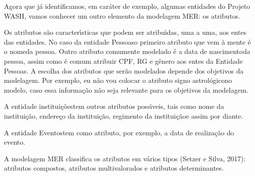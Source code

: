 \documentclass[
12pt,		%
openright,	%
twoside,  %
a4paper,			%
chapter=TITLE,		%
english,			%
french,				%
spanish,			%
brazil				%
]{USPSC-classe/USPSC}
\begin{document}
Agora que j\'a identificamos, em car\'ater de exemplo, algumas entidades do Projeto WASH, vamos conhecer um outro elemento da modelagem MER: os atributos.














Os atributos s\~ao caracter\'{\i}sticas que podem ser atribu\'{\i}das, uma a uma, aos entes das entidades. No caso da entidade \textquotedbl Pessoas\textquotedbl  o primeiro atributo que vem \`a mente \'e o \textquotedbl nome\textquotedbl  da pessoa. Outro atributo comumente modelado \'e a \textquotedbl data de nascimento\textquotedbl  da pessoa, assim como \'e comum atribuir CPF, RG e g\^enero aos entes da Entidade \textquotedbl Pessoas\textquotedbl . A escolha dos atributos que ser\~ao modelados depende dos objetivos da modelagem. Por exemplo, eu n\~ao vou colocar o atributo \textquotedbl signo astrol\'ogico\textquotedbl  no modelo, caso essa informa\c{c}\~ao n\~ao seja relevante para os objetivos da modelagem.














A entidade \textquotedbl institui\c{c}\~oes\textquotedbl  tem outros atributos poss\'{\i}veis, tais como \textquotedbl nome da institui\c{c}\~ao\textquotedbl , \textquotedbl endere\c{c}o da institui\c{c}\~ao\textquotedbl , \textquotedbl regimento da institui\c{c}\~ao\textquotedbl  e assim por diante.














A entidade \textquotedbl Eventos\textquotedbl  tem como atributo, por exemplo, a data de realiza\c{c}\~ao do evento.














A modelagem MER classifica os atributos em v\'arios tipos (Setzer e Silva, 2017): atributos compostos, atributos multivalorados e atributos determinantes.
\end{document}
